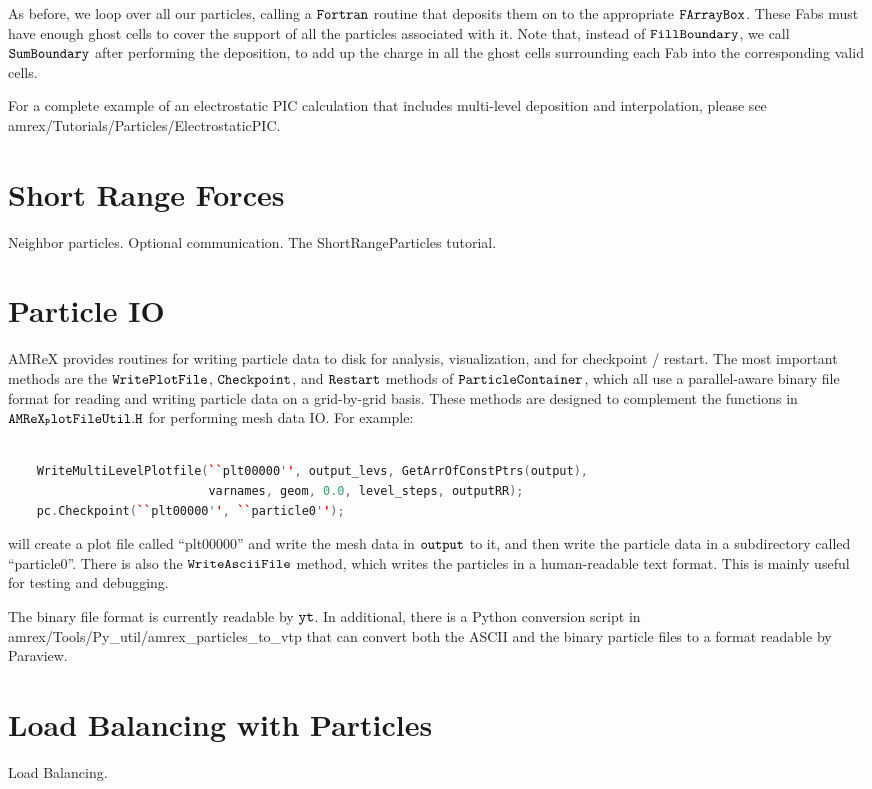 As before, we loop over all our particles, calling a $\tt{Fortran}$ routine that deposits them on to the appropriate $\tt{FArrayBox}$. These Fabs must have enough ghost cells to
cover the support of all the particles associated with it. Note that, instead of $\tt{FillBoundary}$, we call $\tt{SumBoundary}$ after performing the deposition, to add up the charge 
in all the ghost cells surrounding each Fab into the corresponding valid cells.

For a complete example of an electrostatic PIC calculation that includes multi-level deposition and interpolation, please see amrex/Tutorials/Particles/ElectrostaticPIC.

\section{Short Range Forces}
\label{sec:Particles:ShortRange}

Neighbor particles. Optional communication. The ShortRangeParticles tutorial.

\section{Particle IO}
\label{sec:Particles:IO}

AMReX provides routines for writing particle data to disk for analysis, visualization, and for checkpoint / restart. The most important methods are the $\tt{WritePlotFile}$, $\tt{Checkpoint}$, and $\tt{Restart}$ methods of $\tt{ParticleContainer}$, which all use a parallel-aware binary file format for reading and writing particle data on a grid-by-grid basis. These methods are designed to complement the functions in $\tt{AMReX_PlotFileUtil.H}$ for performing mesh data IO. For example:

\begin{lstlisting}[language=cpp]

    WriteMultiLevelPlotfile(``plt00000'', output_levs, GetArrOfConstPtrs(output),
                            varnames, geom, 0.0, level_steps, outputRR);
    pc.Checkpoint(``plt00000'', ``particle0'');

\end{lstlisting}

will create a plot file called ``plt00000'' and write the mesh data in $\tt{output}$ to it, and then write the particle data in a subdirectory called ``particle0''. There is also the $\tt{WriteAsciiFile}$ method, which writes the particles in a human-readable text format. This is mainly useful for testing and debugging.

The binary file format is currently readable by $\tt{yt}$. In additional, there is a Python conversion script in amrex/Tools/Py\_util/amrex\_particles\_to\_vtp that can convert both the ASCII and the binary particle files to a format readable by Paraview. 

\section{Load Balancing with Particles}
\label{sec:Particles:Balancing}

Load Balancing.

